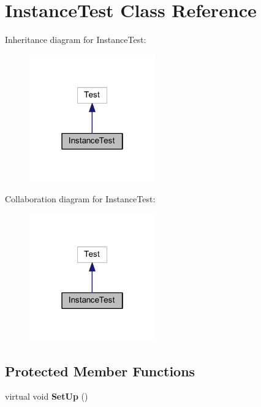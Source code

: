 \hypertarget{class_instance_test}{}\section{Instance\+Test Class Reference}
\label{class_instance_test}


Inheritance diagram for Instance\+Test\+:\nopagebreak
\begin{figure}[H]
\begin{center}
\leavevmode
\includegraphics[width=154pt]{class_instance_test__inherit__graph}
\end{center}
\end{figure}


Collaboration diagram for Instance\+Test\+:\nopagebreak
\begin{figure}[H]
\begin{center}
\leavevmode
\includegraphics[width=154pt]{class_instance_test__coll__graph}
\end{center}
\end{figure}
\subsection*{Protected Member Functions}
\begin{DoxyCompactItemize}
\item 
\hypertarget{class_instance_test_aada9591781662307abc3e7511d14187c}{}\label{class_instance_test_aada9591781662307abc3e7511d14187c} 
virtual void {\bfseries Set\+Up} ()
\end{DoxyCompactItemize}
